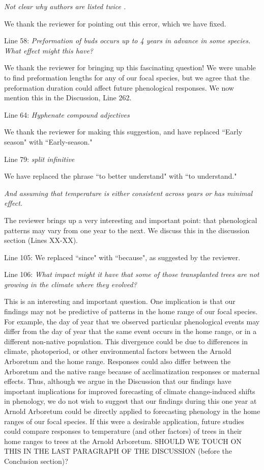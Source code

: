 \documentclass[10.95pt,a4paper]{letter}
\begin{document}
\par \emph{Not clear why authors are listed twice .}
\par We thank the reviewer for pointing out this error, which we have fixed. 

\par Line 58: \emph{Preformation of buds occurs up to 4 years in advance in some species.  What effect might this have?}
\par We thank the reviewer for bringing up this fascinating question! We were unable to find preformation lengths for any of our focal species, but we agree that the preformation duration could affect future phenological responses. We now mention this in the Discussion, Line 262.

\par Line 64: \emph{Hyphenate compound adjectives}
\par We thank the reviewer for making this suggestion, and have replaced ``Early season" with ``Early-season."
 
\par Line 79: \emph{split infinitive}
\par We have replaced the phrase ``to better understand" with ``to understand."
 
\par \emph{And assuming that temperature is either consistent across years or has minimal effect.}
\par The reviewer brings up a very interesting and important point: that phenological patterns may vary from one year to the next. We discuss this in the discussion section (Lines XX-XX). 

\par Line 105: We replaced ``since" with ``because", as suggested by the reviewer.

\par Line 106: \emph{What impact might it have that some of those transplanted trees are not growing in the climate where they evolved?}
\par This is an interesting and important question. One implication is that our findings may not be predictive of patterns in the home range of our focal species. For example,  the 
day of year that we observed particular phenological events may differ from the day of year that the same event occurs in the home range, or in a different non-native population. This divergence could be due to differences in climate, photoperiod, or other environmental factors between the Arnold Arboretum and the home range. Responses could also differ between the Arboretum and the native range because of acclimatization responses or maternal effects.  Thus, although we argue in the Discussion that our findings have important implications for improved forecasting of climate change-induced shifts in phenology, we do not wish to suggest that our findings during this one year at Arnold Arboretum could be directly applied to forecasting phenology in the home ranges of our focal species. If this were a desirable application, future studies could compare responses to temperature (and other factors) of trees in their home ranges to trees at the Arnold Arboretum. SHOULD WE TOUCH ON THIS IN THE LAST PARAGRAPH OF THE DISCUSSION (before the Conclusion section)?
\end{document}
